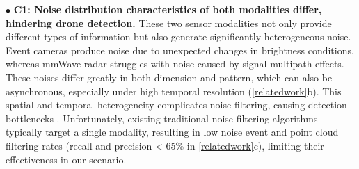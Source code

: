 \noindent $\bullet$ \textbf{C1: Noise distribution characteristics of both modalities differ, hindering drone detection.}
These two sensor modalities not only provide different types of information but also generate significantly heterogeneous noise. 
Event cameras produce noise due to unexpected changes in brightness conditions, whereas mmWave radar struggles with noise caused by signal multipath effects.
These noises differ greatly in both dimension and pattern, which can also be asynchronous, especially under high temporal resolution (\fig \ref{relatedwork}b).
This spatial and temporal heterogeneity complicates noise filtering, causing detection bottlenecks \cite{xu2023taming}.
Unfortunately, existing traditional noise filtering algorithms \cite{cao2024virteach, liu2024pmtrack, wang2021asynchronous, alzugaray2018asynchronous} typically target a single modality, resulting in low noise event and point cloud filtering rates (recall and precision < 65\% in \fig \ref{relatedwork}c), limiting their effectiveness in our scenario.




